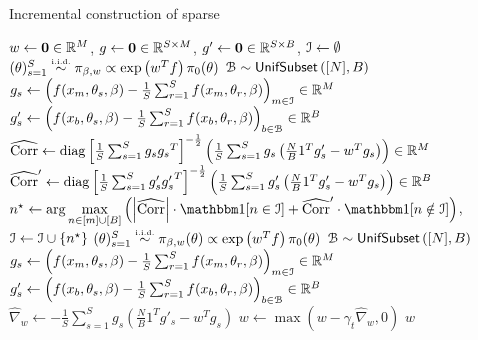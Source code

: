 \setlength{\textfloatsep}{10pt}%

\begin{algorithm*}[!t]
	  \scriptsize
	\caption{Incremental construction of sparse \bpost{}}
	\label{alg:bcores}
	\begin{algorithmic}[1]
		\State $w \leftarrow \mathbf{0} \in \mathbb{R}^{M}$,\;\; $g \leftarrow \mathbf{0} \in \mathbb{R}^{S \times M}$, \;\;$g' \leftarrow \mathbf{0} \in \mathbb{R}^{S \times B}$, \;\;$\mathcal{I} \leftarrow \emptyset$
		\State $(\theta)_{s=1}^{S}  \distiid \pi_{\beta,w} \propto \exp \left(w^Tf\right) \pi_0(\theta)$
		\State $\mathcal{B}\sim{\sf{UnifSubset}}\left([N], B\right)$
		\State $g_{s} \gets \left( f(x_m, \theta_s, \beta ) - \frac{1}{S}\sum_{r=1}^S f(x_m, \theta_{r}, \beta) \right)_{m \in \mathcal{I}}\in \mathbb{R}^M$ 
		\State  $g'_{s} \gets \left( f(x_b, \theta_s, \beta) - \frac{1}{S}\sum_{r=1}^S f(x_b, \theta_{r}, \beta) \right)_{b\in\mathcal{B}} \in \mathbb{R}^B$
		\State $\widehat{\operatorname{Corr}} \leftarrow \operatorname{diag} \left[ \frac{1}{S} \sum_{s=1}^{S} g_{s}
		{g_{s}}^T\right]^{-\frac{1}{2}} \left(\frac{1}{S} \sum_{s=1}^{S} g_{s} \left(\frac{N}{B}1^T g'_{s} - w^T g_{s}\right)\right) \in \mathbb{R}^{M}$
		\label{lst:line:core-corr}
		\State $\widehat{\operatorname{Corr}}' \leftarrow \operatorname{diag} \left[ \frac{1}{S} \sum_{s=1}^{S} g'_{s}
		{g'_{s}}^T\right]^{-\frac{1}{2}} \left(\frac{1}{S} \sum_{s=1}^{S} g'_{s} \left(\frac{N}{B}1^T g'_{s} - w^T g_{s}\right)\right)  \in \mathbb{R}^{B}$
		\label{lst:line:batch-corr}
		\State $n^{\star} \assign \arg \underset{n \in [m] \cup [B]}{\max} \left( \left|\hcorr \right| \cdot \vecone[n \in \mcI] + \hcorr' \cdot \vecone [n \notin \mcI]\right)$, \;\;$ \mathcal{I} \leftarrow \mathcal{I} \cup \{n^{\star}\}$
		\State $(\theta)_{s=1}^{S}  \distiid \pi_{\beta,w}(\theta) \propto \exp\left(w^T f\right)\pi_0(\theta)$ 
		\State $\mathcal{B}\sim{\sf{UnifSubset}}\left([N], B\right)$
		\State $g_{s} \gets \left( f(x_m, \theta_s, \beta) - \frac{1}{S}\sum_{r=1}^S f(x_m, \theta_{r}, \beta) \right)_{m\in\mathcal{I}} \in \mathbb{R}^M$  	
		\State $g'_{s} \gets \left( f(x_b, \theta_s, \beta) - \frac{1}{S}\sum_{r=1}^S f(x_b, \theta_{r}, \beta) \right)_{b\in\mathcal{B}} \in \mathbb{R}^B$  	
		\EndFor
		\State $\hat\nabla_w \gets -\frac{1}{S}\sum_{s=1}^S g_s\left( \frac{N}{B} 1^Tg'_s- w^Tg_s\right)$
		\label{lst:line:mc-grad}
		\State $w \gets \max(w - \gamma_t\hat\nabla_w, 0)$
		\EndFor
		\EndFor
		\State\Return $w$%
		\EndProcedure		 
	\end{algorithmic}
\end{algorithm*}


